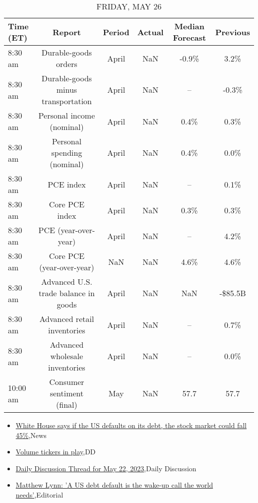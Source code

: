 \documentclass{article}%
\begin{document}
\begin{table}[htbp]%
\caption{FRIDAY, MAY 26}%
\centering%
\begin{adjustbox}{width=1\textwidth}%
\begin{tabular}{lccccc}
\toprule
Time (ET) &                               Report & Period & Actual & Median Forecast & Previous \\
\midrule
  8:30 am &                 Durable-goods orders &  April &    NaN &           -0.9\% &     3.2\% \\
  8:30 am &   Durable-goods minus transportation &  April &    NaN &              -- &    -0.3\% \\
  8:30 am &            Personal income (nominal) &  April &    NaN &            0.4\% &     0.3\% \\
  8:30 am &          Personal spending (nominal) &  April &    NaN &            0.4\% &     0.0\% \\
  8:30 am &                            PCE index &  April &    NaN &              -- &     0.1\% \\
  8:30 am &                       Core PCE index &  April &    NaN &            0.3\% &     0.3\% \\
  8:30 am &                 PCE (year-over-year) &  April &    NaN &              -- &     4.2\% \\
  8:30 am &            Core PCE (year-over-year) &    NaN &    NaN &            4.6\% &     4.6\% \\
  8:30 am & Advanced U.S. trade balance in goods &  April &    NaN &             NaN &  -\$85.5B \\
  8:30 am &          Advanced retail inventories &  April &    NaN &              -- &     0.7\% \\
  8:30 am &       Advanced wholesale inventories &  April &    NaN &              -- &     0.0\% \\
 10:00 am &           Consumer sentiment (final) &    May &    NaN &            57.7 &     57.7 \\
\bottomrule
\end{tabular}
%
\end{adjustbox}%
\end{table}

%
\begin{itemize}%
\item%
\href{https://reddit.com/r/wallstreetbets/comments/13op7nn/white\_house\_says\_if\_the\_us\_defaults\_on\_its\_debt/}{White House says if the US defaults on its debt, the stock market could fall 45\%},News%
\item%
\href{https://reddit.com/r/wallstreetbets/comments/13oouc7/volume\_tickers\_in\_play/}{Volume tickers in play},DD%
\item%
\href{https://reddit.com/r/wallstreetbets/comments/13omies/daily\_discussion\_thread\_for\_may\_22\_2023/}{Daily Discussion Thread for May 22, 2023},Daily Discussion%
\item%
\href{https://reddit.com/r/Economics/comments/13onijx/matthew\_lynn\_a\_us\_debt\_default\_is\_the\_wakeup\_call/}{Matthew Lynn: 'A US debt default is the wake-up call the world needs'},Editorial%
\end{itemize}%
\end{document}
